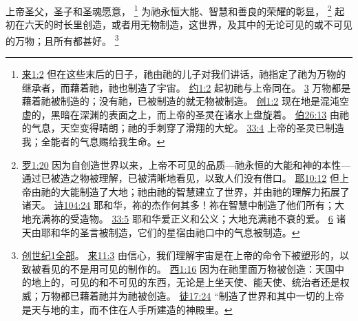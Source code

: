 \documentclass[12pt, a4paper, oneside]{ctexart}
\newcounter{parnum}[section]
\newcommand{\N}{%
   \noindent\refstepcounter{parnum}%
    \makebox[\parindent][l]{\textbf{\arabic{parnum}.}}}
\begin{document}
\N 上帝圣父，圣子和圣魂愿意，
	\footnote {
		\href{https://biblehub.com/hebrews/1-2.htm}{来1:2} 但在这些末后的日子，祂由祂的儿子对我们讲话，祂指定了祂为万物的继承者，而藉着祂，祂也制造了宇宙。
		\href{https://biblehub.com/john/1-2.htm}{约1:2} 起初祂与上帝同在。
		\href{https://biblehub.com/john/1-3.htm}{3} 万物都是藉着祂被制造的；没有祂，已被制造的就无物被制造。
		\href{https://biblehub.com/genesis/1-2.htm}{创1:2} 现在地是混沌空虚的，黑暗在深渊的表面之上，而上帝的圣灵在诸水上盘旋着。
		\href{https://biblehub.com/job/26-13.htm}{伯26:13} 由祂的气息，天空变得晴朗；祂的手刺穿了滑翔的大蛇。
		\href{https://biblehub.com/job/33-4.htm}{33:4} 上帝的圣灵已制造我；全能者的气息赐给我生命。
	}
	为祂永恒大能、智慧和善良的荣耀的彰显，
	\footnote {
		\href{https://biblehub.com/romans/1-20.htm}{罗1:20} 因为自创造世界以来，上帝不可见的品质---祂永恒的大能和神的本性---通过已被造之物被理解，已被清晰地看见，以致人们没有借口。
		\href{https://biblehub.com/jeremiah/10-12.htm}{耶10:12} 但上帝由祂的大能制造了大地；祂由祂的智慧建立了世界，并由祂的理解力拓展了诸天。
		\href{https://biblehub.com/psalms/104-24.htm}{诗104:24} 耶和华，祢的杰作何其多！祢在智慧中制造了他们所有；大地充满祢的受造物。
		\href{https://biblehub.com/psalms/33-5.htm}{33:5} 耶和华爱正义和公义；大地充满祂不衰的爱。
		\href{https://biblehub.com/psalms/33-6.htm}{6} 诸天由耶和华的圣言被制造，它们的星宿由祂口中的气息被制造。
	}
	起初在六天的时长里创造，或者用无物制造，这世界，及其中的无论可见的或不可见的万物；且所有都甚好。
	\footnote {
		\href{https://biblehub.com/niv/genesis/1.htm}{创世纪1全部}。
		\href{https://biblehub.com/hebrews/11-3.htm}{来11:3} 由信心，我们理解宇宙是在上帝的命令下被塑形的，以致被看见的不是用可见的制作的。
		\href{https://biblehub.com/colossians/1-16.htm}{西1:16} 因为在祂里面万物被创造：天国中的地上的，可见的和不可见的东西，无论是上坐天使、能天使、统治者还是权威；万物都已藉着祂并为祂被创造。
		\href{https://biblehub.com/acts/17-24.htm}{徒17:24} “制造了世界和其中一切的上帝是天与地的主，而不住在人手所建造的神殿里。
	}
\end{document}
